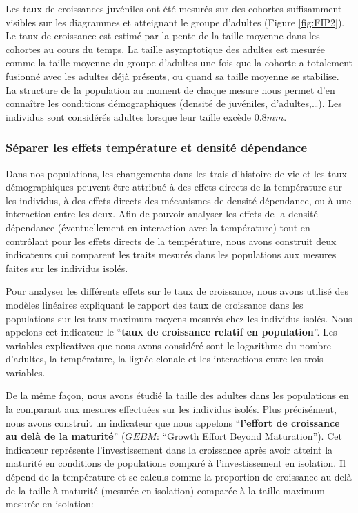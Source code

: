 Les taux de croissances juvéniles ont été mesurés sur des cohortes suffisamment
visibles sur les diagrammes et atteignant le groupe d'adultes (Figure
\ref{fig:FIP2}).
Le taux de croissance est estimé par la pente de la taille moyenne dans les cohortes au
cours du temps. La taille asymptotique des adultes est mesurée comme la taille
moyenne du groupe d'adultes une fois que la cohorte a totalement fusionné avec
les adultes déjà présents, ou quand sa taille moyenne se stabilise. La structure
de la population au moment de chaque mesure nous permet d'en connaître les
conditions démographiques (densité de juvéniles, d'adultes,\ldots). Les
individus sont considérés adultes lorsque leur taille excède $0.8mm$.

\subsubsection{Séparer les effets température et densité dépendance}

Dans nos populations, les changements dans les trais d'histoire de vie et les
taux démographiques peuvent être attribué à des effets directs de la température
sur les individus, à des effets directs des mécanismes de densité dépendance, ou
à une interaction entre les deux. Afin de pouvoir analyser les effets de la
densité dépendance (éventuellement en interaction avec la température) tout en
contrôlant pour les effets directs de la température, nous avons construit deux
indicateurs qui comparent les traits mesurés dans les populations aux mesures
faites sur les individus isolés. 

Pour analyser les différents effets sur le taux de croissance, nous avons
utilisé des modèles linéaires expliquant le rapport des taux de croissance dans
les populations sur les taux maximum moyens mesurés chez les individus isolés.
Nous appelons cet indicateur le ``\textbf{taux de croissance relatif en
population}''. Les variables explicatives que nous avons considéré sont le
logarithme du nombre d'adultes, la température, la lignée clonale et les
interactions entre les trois variables. 

De la même façon, nous avons étudié la taille des adultes dans les populations
en la comparant aux mesures effectuées sur les individus isolés. Plus
précisément, nous avons construit un indicateur que nous appelons
``\textbf{l'effort de croissance au delà de la maturité}'' ($GEBM$: ``Growth
Effort Beyond Maturation''). Cet indicateur représente l'investissement dans la
croissance après avoir atteint la maturité en conditions de populations comparé
à l'investissement en isolation. Il dépend de la température et se calculs comme
la proportion de croissance au delà de la taille à maturité (mesurée en isolation) comparée à la taille
maximum mesurée en isolation:

